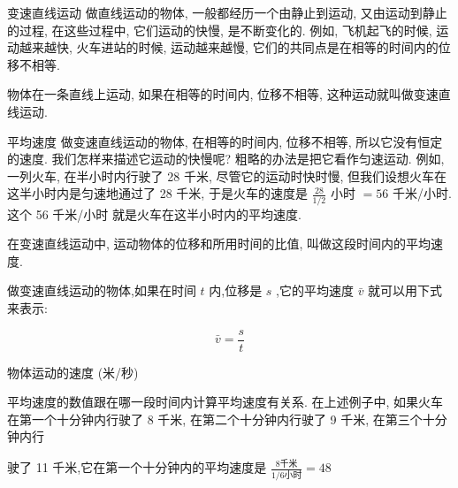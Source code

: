 \documentclass[10pt]{article}
\begin{document}
变速直线运动 做直线运动的物体, 一般都经历一个由静止到运动, 又由运动到静止的过程, 在这些过程中, 它们运动的快慢, 是不断变化的. 例如, 飞机起飞的时候, 运动越来越快, 火车进站的时候, 运动越来越慢, 它们的共同点是在相等的时间内的位移不相等.

物体在一条直线上运动, 如果在相等的时间内, 位移不相等, 这种运动就叫做变速直线运动.

平均速度 做变速直线运动的物体, 在相等的时间内, 位移不相等, 所以它没有恒定的速度. 我们怎样来描述它运动的快慢呢? 粗略的办法是把它看作匀速运动. 例如, 一列火车, 在半小时内行驶了 28 千米, 尽管它的运动时快时慢, 但我们设想火车在这半小时内是匀速地通过了 28 千米, 于是火车的速度是 \(\frac{28}{1/2}\) 小时 \(= {56}\) 千米/小时. 这个 56 千米/小时 就是火车在这半小时内的平均速度.

在变速直线运动中, 运动物体的位移和所用时间的比值, 叫做这段时间内的平均速度.

做变速直线运动的物体,如果在时间 \(t\) 内,位移是 \(s\) ,它的平均速度 \(\bar{v}\) 就可以用下式来表示:

\[
\bar{v} = \frac{s}{t}
\]

物体运动的速度 (米/秒)

\begin{center}
\end{center}

平均速度的数值跟在哪一段时间内计算平均速度有关系. 在上述例子中, 如果火车在第一个十分钟内行驶了 8 千米, 在第二个十分钟内行驶了 9 千米, 在第三个十分钟内行

驶了 11 千米,它在第一个十分钟内的平均速度是 \(\frac{8\text{千米}}{1/6\text{小时}} = {48}\)
\end{document}
